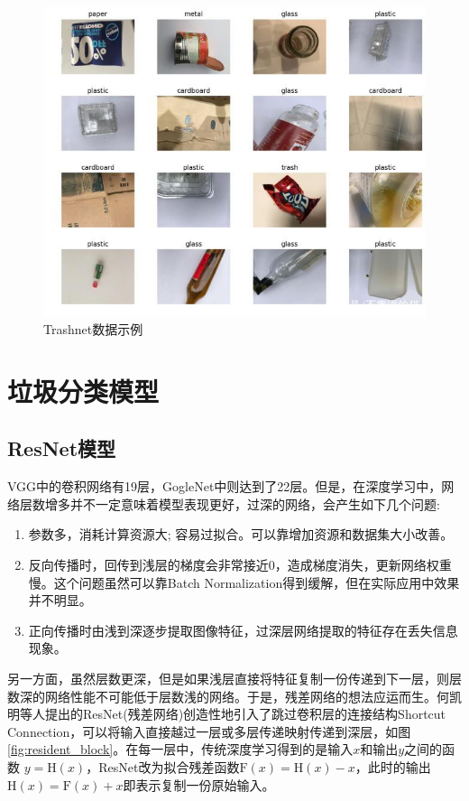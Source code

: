 \documentclass[a4paper]{article}
\begin{document}
\begin{CJK*}{UTF8}{gbsn}
\begin{enumerate}
\begin{figure}[h!]
\centering
\includegraphics[scale=0.4]{trashnet_example.jpeg}
\caption{Trashnet数据示例}
\label{fig:trashnet_example}
\end{figure}

\end{enumerate}

\section{垃圾分类模型}
\subsection{ResNet模型}

VGG中的卷积网络有19层，GogleNet中则达到了22层。但是，在深度学习中，网络层数增多并不一定意味着模型表现更好，过深的网络，会产生如下几个问题:

\begin{enumerate}
    \item 参数多，消耗计算资源大; 容易过拟合。可以靠增加资源和数据集大小改善。
    \item 反向传播时，回传到浅层的梯度会非常接近0，造成梯度消失，更新网络权重慢。这个问题虽然可以靠Batch Normalization得到缓解，但在实际应用中效果并不明显。
    \item 正向传播时由浅到深逐步提取图像特征，过深层网络提取的特征存在丢失信息现象。
\end{enumerate}

另一方面，虽然层数更深，但是如果浅层直接将特征复制一份传递到下一层，则层数深的网络性能不可能低于层数浅的网络。于是，残差网络的想法应运而生。何凯明等人提出的ResNet(残差网络)\cite{he2016deep}创造性地引入了跳过卷积层的连接结构Shortcut Connection，可以将输入直接越过一层或多层传递映射传递到深层，如图\ref{fig:resident_block}。在每一层中，传统深度学习得到的是输入$x$和输出$y$之间的函数 $y=\mathrm{H}(x)$，ResNet改为拟合残差函数$\mathrm{F}(x)=\mathrm{H}(x)-x$，此时的输出$\mathrm{H}(x)=\mathrm{F}(x)+x$即表示复制一份原始输入。


\end{CJK*}
\end{document}
